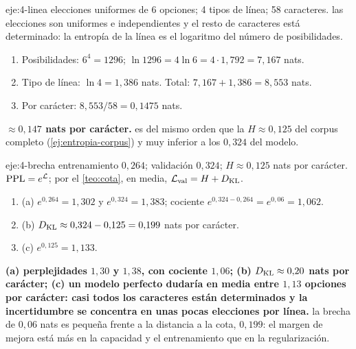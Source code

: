 \begin{solucion}{eje:4-linea}
 elecciones uniformes de 6 opciones; 4 tipos de línea; 58 caracteres.
\planteamiento las elecciones son uniformes e independientes y el resto de caracteres está determinado: la entropía de la línea es el logaritmo del número de posibilidades.
\pasos
\begin{enumerate}[label=\arabic*.]
  \item Posibilidades: $6^{4}=1296$; $\ln 1296=4\ln 6=4\cdot 1{,}792=7{,}167$ nats.
  \item Tipo de línea: $\ln 4=1{,}386$ nats. Total: $7{,}167+1{,}386=8{,}553$ nats.
  \item Por carácter: $8{,}553/58=0{,}1475$ nats.
\end{enumerate}
\resultado \textbf{$\approx 0{,}147$ nats por carácter.}
\comprobacion es del mismo orden que la $H\approx 0{,}125$ del corpus completo (\cref{ej:entropia-corpus}) y muy inferior a los $0{,}324$ del modelo.
\end{solucion}

\begin{solucion}{eje:4-brecha}
\datos entrenamiento $0{,}264$; validación $0{,}324$; $H\approx 0{,}125$ nats por carácter.
\planteamiento $\operatorname{PPL}=e^{\mathcal{L}}$; por el \cref{teo:cota}, en media, $\mathcal{L}_{\mathrm{val}}=H+D_{\mathrm{KL}}$.
\pasos
\begin{enumerate}[label=\arabic*.]
  \item (a) $e^{0{,}264}=1{,}302$ y $e^{0{,}324}=1{,}383$; cociente $e^{0{,}324-0{,}264}=e^{0{,}06}=1{,}062$.
  \item (b) $D_{\mathrm{KL}}\approx 0{,}324-0{,}125=0{,}199$ nats por carácter.
  \item (c) $e^{0{,}125}=1{,}133$.
\end{enumerate}
\resultado \textbf{(a) perplejidades $1{,}30$ y $1{,}38$, con cociente $1{,}06$; (b) $D_{\mathrm{KL}}\approx 0{,}20$ nats por carácter; (c) un modelo perfecto dudaría en media entre $1{,}13$ opciones por carácter: casi todos los caracteres están determinados y la incertidumbre se concentra en unas pocas elecciones por línea.}
\comprobacion la brecha de $0{,}06$ nats es pequeña frente a la distancia a la cota, $0{,}199$: el margen de mejora está más en la capacidad y el entrenamiento que en la regularización.
\end{solucion}

